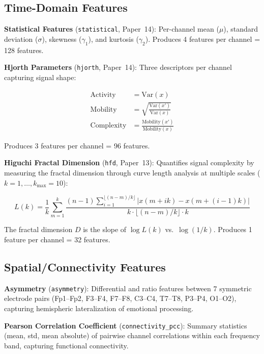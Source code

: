 \documentclass[12pt,a4paper]{report}
\begin{document}
\subsection{Time-Domain Features}

\textbf{Statistical Features} (\texttt{statistical}, Paper~14): Per-channel
mean ($\mu$), standard deviation ($\sigma$), skewness ($\gamma_1$), and
kurtosis ($\gamma_2$). Produces 4 features per channel = 128 features.

\textbf{Hjorth Parameters} (\texttt{hjorth}, Paper~14): Three descriptors
per channel capturing signal shape:

\begin{align}
    \text{Activity} &= \text{Var}(x) \\
    \text{Mobility} &= \sqrt{\frac{\text{Var}(x')}{\text{Var}(x)}} \\
    \text{Complexity} &= \frac{\text{Mobility}(x')}{\text{Mobility}(x)}
\end{align}

\noindent Produces 3 features per channel = 96 features.

\textbf{Higuchi Fractal Dimension} (\texttt{hfd}, Paper~13): Quantifies signal
complexity by measuring the fractal dimension through curve length analysis at
multiple scales ($k = 1, \ldots, k_{\max}=10$):

\begin{equation}
    L(k) = \frac{1}{k} \sum_{m=1}^{k} \frac{(n-1) \sum_{i=1}^{\lfloor(n-m)/k\rfloor}
    |x(m+ik) - x(m+(i-1)k)|}{k \cdot \lfloor(n-m)/k\rfloor \cdot k}
\end{equation}

The fractal dimension $D$ is the slope of $\log L(k)$ vs.\ $\log(1/k)$.
Produces 1 feature per channel = 32 features.

\subsection{Spatial/Connectivity Features}

\textbf{Asymmetry} (\texttt{asymmetry}): Differential and ratio features
between 7 symmetric electrode pairs (Fp1--Fp2, F3--F4, F7--F8, C3--C4,
T7--T8, P3--P4, O1--O2), capturing hemispheric lateralization of emotional
processing.

\textbf{Pearson Correlation Coefficient} (\texttt{connectivity\_pcc}):
Summary statistics (mean, std, mean absolute) of pairwise channel correlations
within each frequency band, capturing functional connectivity.
\end{document}
